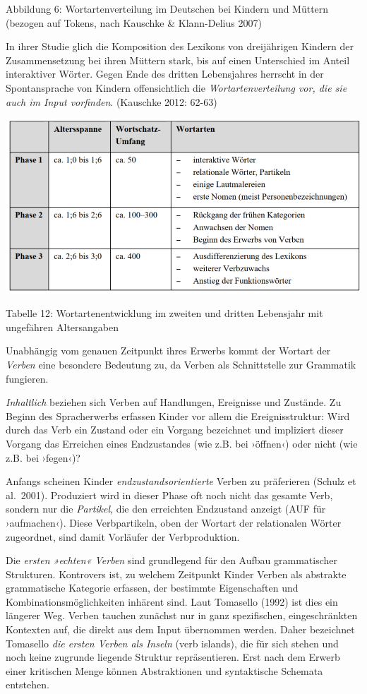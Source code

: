 \documentclass[
  letterpaper,
]{scrbook}
\begin{document}
Abbildung 6: Wortartenverteilung im Deutschen bei Kindern und Müttern
(bezogen auf Tokens, nach Kauschke \& Klann-Delius 2007)

In ihrer Studie glich die Komposition des Lexikons von dreijährigen
Kindern der Zusammensetzung bei ihren Müttern stark, bis auf einen
Unterschied im Anteil interaktiver Wörter. Gegen Ende des dritten
Lebensjahres herrscht in der Spontansprache von Kindern offensichtlich
die \emph{Wortartenverteilung vor, die sie auch im Input vorfinden}.
(Kauschke 2012: 62-63)

\includegraphics[width=1\textwidth,height=\textheight]{./pictures/kauschke_tab12.png}

Tabelle 12: Wortartenentwicklung im zweiten und dritten Lebensjahr mit
ungefähren Altersangaben

Unabhängig vom genauen Zeitpunkt ihres Erwerbs kommt der Wortart der
\emph{Verben} eine besondere Bedeutung zu, da Verben als Schnittstelle
zur Grammatik fungieren.

\emph{Inhaltlich} beziehen sich Verben auf Handlungen, Ereignisse und
Zustände. Zu Beginn des Spracherwerbs erfassen Kinder vor allem die
Ereignisstruktur: Wird durch das Verb ein Zustand oder ein Vorgang
bezeichnet und impliziert dieser Vorgang das Erreichen eines
Endzustandes (wie z.B. bei ›öffnen‹) oder nicht (wie z.B. bei ›fegen‹)?

Anfangs scheinen Kinder \emph{endzustandsorientierte} Verben zu
präferieren (Schulz et al.~2001). Produziert wird in dieser Phase oft
noch nicht das gesamte Verb, sondern nur die \emph{Partikel}, die den
erreichten Endzustand anzeigt (AUF für ›aufmachen‹). Diese
Verbpartikeln, oben der Wortart der relationalen Wörter zugeordnet, sind
damit Vorläufer der Verbproduktion.

Die \emph{ersten »echten« Verben} sind grundlegend für den Aufbau
grammatischer Strukturen. Kontrovers ist, zu welchem Zeitpunkt Kinder
Verben als abstrakte grammatische Kategorie erfassen, der bestimmte
Eigenschaften und Kombinationsmöglichkeiten inhärent sind. Laut
Tomasello (1992) ist dies ein längerer Weg. Verben tauchen zunächst nur
in ganz spezifischen, eingeschränkten Kontexten auf, die direkt aus dem
Input übernommen werden. Daher bezeichnet Tomasello \emph{die ersten
Verben als Inseln} (verb islands), die für sich stehen und noch keine
zugrunde liegende Struktur repräsentieren. Erst nach dem Erwerb einer
kritischen Menge können Abstraktionen und syntaktische Schemata
entstehen.
\end{document}
